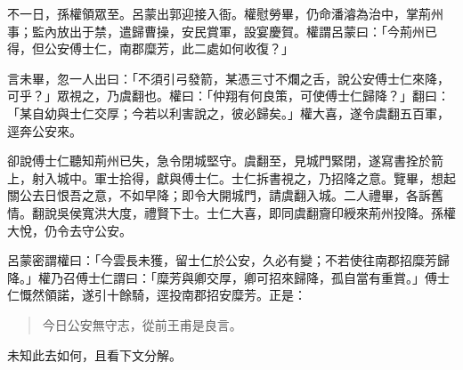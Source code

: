 不一日，孫權領眾至。呂蒙出郭迎接入衙。權慰勞畢，仍命潘濬為治中，掌荊州事；監內放出于禁，遣歸曹操，安民賞軍，設宴慶賀。權謂呂蒙曰：「今荊州已得，但公安傅士仁，南郡糜芳，此二處如何收復？」

言未畢，忽一人出曰：「不須引弓發箭，某憑三寸不爛之舌，說公安傅士仁來降，可乎？」眾視之，乃虞翻也。權曰：「仲翔有何良策，可使傅士仁歸降？」翻曰：「某自幼與士仁交厚；今若以利害說之，彼必歸矣。」權大喜，遂令虞翻五百軍，逕奔公安來。

卻說傅士仁聽知荊州已失，急令閉城堅守。虞翻至，見城門緊閉，遂寫書拴於箭上，射入城中。軍士拾得，獻與傅士仁。士仁拆書視之，乃招降之意。覽畢，想起關公去日恨吾之意，不如早降；即令大開城門，請虞翻入城。二人禮畢，各訴舊情。翻說吳侯寬洪大度，禮賢下士。士仁大喜，即同虞翻齎印綬來荊州投降。孫權大悅，仍令去守公安。

呂蒙密謂權曰：「今雲長未獲，留士仁於公安，久必有變；不若使往南郡招糜芳歸降。」權乃召傅士仁謂曰：「糜芳與卿交厚，卿可招來歸降，孤自當有重賞。」傅士仁慨然領諾，遂引十餘騎，逕投南郡招安糜芳。正是：

\begin{quote}
今日公安無守志，從前王甫是良言。
\end{quote}

未知此去如何，且看下文分解。
